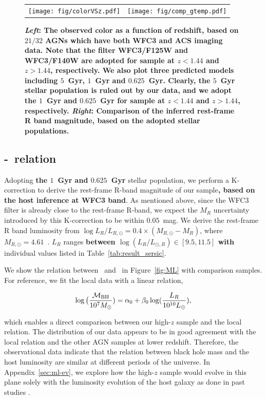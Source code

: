 \documentclass[apj]{emulateapj}
\begin{document}
\begin{figure}
\centering
\begin{tabular}{c c}
{\texttt{[image: fig/colorVSz.pdf]}}&
{\texttt{[image: fig/comp\_gtemp.pdf]}}\\
\end{tabular}
\caption{\label{fig:compare_temp} 
{\bf {\it Left}: The observed color as a function of redshift, based on $21/32$ AGNs which have both WFC3 and ACS imaging data. Note that the filter WFC3/F125W and WFC3/F140W are adopted for sample at $z<1.44$ and $z>1.44$, respectively. 
We also plot three predicted models including $5$~Gyr, $1$~Gyr and $0.625$~Gyr. Clearly, the $5$~Gyr stellar population is ruled out by our data, and we adopt the $1$~Gyr and $0.625$~Gyr for sample at $z<1.44$ and $z>1.44$, respectively.
 {\it Right}: Comparison of the inferred rest-frame R band magnitude, based on the adopted stellar populations.
 }
}
\end{figure} 


 
\subsection{\mbh-\lhost\ relation}\label{sec:ml}

Adopting {\bf the $1$~Gyr and $0.625$~Gyr} stellar population, we perform a K-correction to derive the rest-frame R-band magnitude of our sample{\bf, based on the host inference at WFC3 band}. As mentioned above, since the WFC3 filter is already close to the rest-frame R-band, we expect the $M_R$ uncertainty introduced by this K-correction to be within $0.05$~mag. We derive the rest-frame R band luminosity from $\log L_R/L_{R, \odot} = 0.4\times(M_{R, \odot}-M_R)$, where $M_{R, \odot}=4.61$~\citep{Blanton07}. $L_R$ ranges {\bf between $\log (L_R/L_{\odot,R})  \in [9.5, 11.5]$ with} individual values listed in Table~\ref{tab:result_sersic}. 

We show the relation between \mbh\ and \lhost\ in Figure~\ref{fig:ML} with comparison samples. For reference, we fit the local data with a linear relation,

\begin{eqnarray}
\label{eq:MLlocal}
\log \big( \frac{\mathcal M_{\rm BH}}{10^{7}M_{\odot}})= \alpha_0 + \beta_0 \log(\frac{L_R}{10^{10}L_{\odot}}),
\end {eqnarray}

\noindent which enables a direct comparison between our high-$z$ sample and the local relation. The distribution of our data appears to be in good agreement with the local relation and the other AGN samples at lower redshift. Therefore, the observational data indicate that the relation between black hole mass and the host luminosity are similar at different periods of the universe. In Appendix~\ref{sec:ml-ev}, we explore how the high-$z$  sample would evolve in this plane solely with the luminosity evolution of the host galaxy as done in past studies \citep[e.g., ][]{Ding2017b}. 
\end{document}
